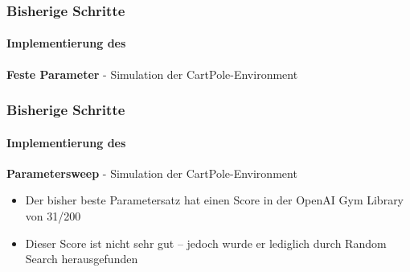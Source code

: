 \documentclass[10pt,t,aspectratio=1610]{beamer}
\begin{document}
\begin{frame}
  \frametitle{Bisherige Schritte}
  \framesubtitle{Implementierung des }
  
  \textbf{Feste Parameter} - Simulation der CartPole-Environment\\
  \vspace{1cm}
  
  \begin{figure}[htb]
  	\centering
  	\begin{minipage}[t]{0.48\linewidth}
  		\centering
  		\scalebox{0.2}{}
  	\end{minipage}
  	\hfill
  	\begin{minipage}[t]{0.48\linewidth}
  		\centering
  		\scalebox{0.2}{}
  	\end{minipage}
  \end{figure}

\end{frame}


\begin{frame}
  \frametitle{Bisherige Schritte}
  \framesubtitle{Implementierung des }

  \textbf{Parametersweep} - Simulation der CartPole-Environment\\

  \begin{itemize}
  	\item Der bisher beste Parametersatz hat einen Score in der OpenAI Gym Library von 31/200
  	\item Dieser Score ist nicht sehr gut – jedoch wurde er lediglich durch Random Search herausgefunden
  \end{itemize}
  \vspace{0.5cm}

  \begin{figure}[htb]
  	\centering
  	\begin{minipage}[t]{0.48\linewidth}
  		\centering
  		\scalebox{0.2}{}
  	\end{minipage}
  	\hfill
  	\begin{minipage}[t]{0.48\linewidth}
  		\centering
  		\scalebox{0.2}{}
  	\end{minipage}
  \end{figure}

\end{frame}
\end{document}
